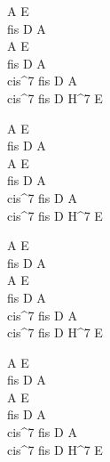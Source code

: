 \begin{chord}
    A E\\
	fis D A\\
	A E\\
	fis D A\\
	cis^7 fis D A\\
	cis^7 fis D H^7 E
	
	A E\\
	fis D A\\
	A E\\
	fis D A\\
	cis^7 fis D A\\
	cis^7 fis D H^7 E
	
	A E\\
	fis D A\\
	A E\\
	fis D A\\
	cis^7 fis D A\\
	cis^7 fis D H^7 E
	
	A E\\
	fis D A\\
	A E\\
	fis D A\\
	cis^7 fis D A\\
	cis^7 fis D H^7 E
\end{chord}